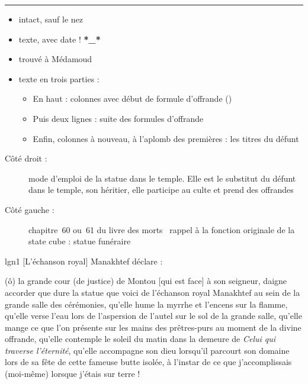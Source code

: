 \documentclass[dvipsnames,a4paper,twoside,10pt,openany,article]{memoir}
\newcommand{\separation}{%
  {\noi\hspace*{\fill}\rule{.33\textwidth}{1pt}\hspace*{\fill}}%
}
\begin{document}
\separation

\begin{itemize}
  \item intact, sauf le nez
  \item texte, avec date ! \textbf{*\_*}
  \item trouvé à Médamoud
  \item texte en trois parties :
  \begin{itemize}
    \item En haut : colonnes avec début de formule d'offrande 
          ()
    \item Puis deux lignes : suite des formules d'offrande
    \item Enfin, colonnes à nouveau, à l'aplomb des premières : 
          les titres du défunt
  \end{itemize}
\end{itemize}

\begin{description}
  \item[Côté droit :] mode d'emploi de la statue dans le temple. 
        Elle est le substitut du défunt dans le temple, son héritier, 
        elle participe au culte et prend des offrandes
  \item[Côté gauche :] chapitre~\num{60} ou~\num{61} du livre des 
        morts \donc~rappel à la fonction originale de la state cube :
        statue funéraire
\end{description}


\begin{encadre}[font=\em, frametitle={Traduction 
                \autocite[doc.~\num{86}]{ChB}}]
  lgn{1} [L'échanson royal] Manakhtef déclare : 

  \og (ô) la grande cour (de justice) de Montou  [qui est face] 
  à son seigneur, daigne accorder que dure la statue que voici de 
  l'échanson royal  Manakhtef au sein de la grande salle des 
  cérémonies, qu'elle hume  la myrrhe et l'encens sur la 
  flamme, qu'elle verse l'eau lors de l'aspersion de l'autel sur 
   le sol de la grande salle, qu'elle mange ce que l'on 
  présente  sur les mains des prêtres-purs au moment de 
   la divine offrande, qu'elle contemple le soleil du matin 
  dans la demeure de \emph{Celui qui traverse l'éternité},  
  qu'elle accompagne son dieu lorsqu'il parcourt son domaine lors de 
  sa fête de cette fameuse butte isolée\footnotemark{}, à l'instar de 
  ce que j'accomplissais (moi-même) lorsque j'étais sur terre ! \fg
\end{encadre}
\end{document}
